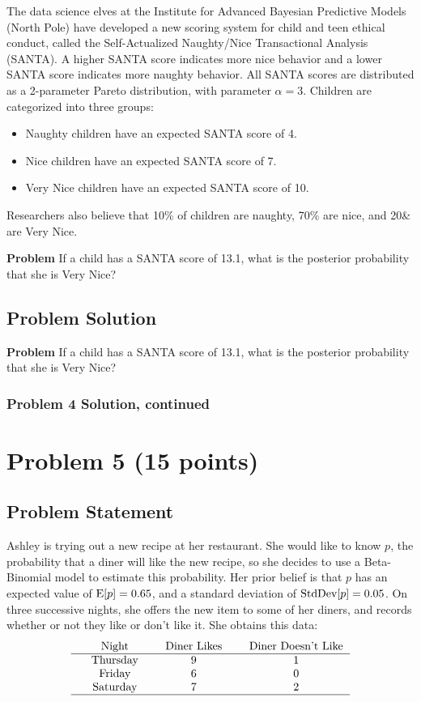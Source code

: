 \documentclass[12pt]{article}
\theoremstyle{definition}
\begin{document}
The data science elves at the Institute for Advanced Bayesian Predictive Models (North Pole) have developed a new scoring system for child and teen ethical conduct, called the Self-Actualized Naughty/Nice Transactional Analysis (SANTA). A higher SANTA score indicates more nice behavior and a lower SANTA score indicates more naughty behavior. All SANTA scores are distributed as a 2-parameter Pareto distribution, with parameter $\alpha = 3$. Children are categorized into three groups:
\begin{itemize}
	\item Naughty children have an expected SANTA score of 4.
	\item Nice children have an expected SANTA score of 7.
	\item Very Nice children have an expected SANTA score of 10.
\end{itemize}
Researchers also believe that 10\% of children are naughty, 70\% are nice, and 20\& are Very Nice.

\bigskip
\noindent
{\bf Problem} If a child has a SANTA score of 13.1, what is the posterior probability that she is Very Nice?




\subsection*{Problem Solution}

\noindent
{\bf Problem} If a child has a SANTA score of 13.1, what is the posterior probability that she is Very Nice?
	
\newpage
\subsubsection*{Problem 4 Solution, continued}


\newpage
\section*{Problem 5 (15 points)}

\subsection*{Problem Statement}

Ashley is trying out a new recipe at her restaurant. She would like to know $p$, the probability that a diner will like the new recipe, so she decides to use a Beta-Binomial model to estimate this probability. Her prior belief is that $p$ has an expected value of $\hbox{E}[p] = 0.65$, and a standard deviation of $\hbox{StdDev}[p] = 0.05$. On three successive nights, she offers the new item to some of her diners, and records whether or not they like or don't like it. She obtains this data:
$$
\begin{tabular}{ccccccc}
& Night & & Diner Likes & & Diner Doesn't Like\\
\hline
& Thursday & & 9 & & 1\\
& Friday & & 6 & & 0\\
& Saturday & & 7 & & 2\\
\hline
\end{tabular}
$$
\end{document}
